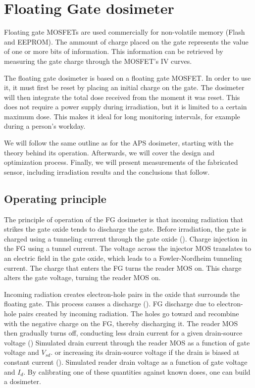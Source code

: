 \section{Floating Gate dosimeter}
Floating gate MOSFETs are used commercially for non-volatile memory (Flash and EEPROM).
The ammount of charge placed on the gate represents the value of one or more bits of information.
This information can be retrieved by measuring the gate charge through the MOSFET's IV curves.

The floating gate dosimeter is based on a floating gate MOSFET.
In order to use it, it must first be reset by placing an initial charge on the gate.
The dosimeter will then integrate the total dose received from the moment it was reset.
This does not require a power supply during irradiation, but it is limited to a certain maximum dose.
This makes it ideal for long monitoring intervals,
for example during a person's workday.

We will follow the same outline as for the APS dosimeter,
starting with the theory behind its operation.
Afterwards, we will cover the design and optimization process.
Finally, we will present measurements of the fabricated sensor,
including irradiation results and the conclusions that follow.
%
\subsection{Operating principle}
The principle of operation of the FG dosimeter is that
incoming radiation that strikes the gate oxide
tends to discharge the gate.
Before irradiation,
the gate is charged using a tunneling current through the gate oxide
().
{ Charge injection in the FG using a tunnel current.
The voltage across the injector MOS translates to an electric field in the gate oxide,
which leads to a Fowler-Nordheim tunneling current.
The charge that enters the FG turns the reader MOS on.}
This charge alters the gate voltage, turning the reader MOS on.

Incoming radiation creates electron-hole pairs in the oxide that surrounds the floating gate.
This process causes a discharge
().
{ FG discharge due to electron-hole pairs created by incoming radiation.
The holes go toward and recombine with the negative charge on the FG, thereby discharging it.}
The reader MOS then gradually turns off,
conducting less drain current for a given drain-source voltage
()
{ Simulated drain current through the reader MOS as a function of gate voltage and $V_{sd}$.}
or increasing its drain-source voltage if the drain is biased at constant current
().
{ Simulated reader drain voltage as a function of gate voltage and $I_d$.}
By calibrating one of these quantities against known doses,
one can build a dosimeter.
%
